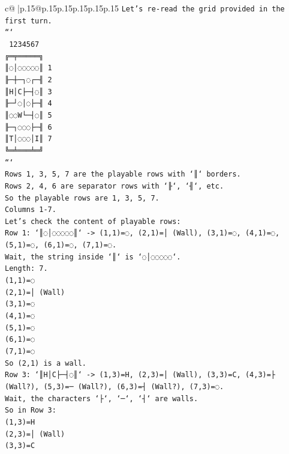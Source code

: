 \documentclass{article}
\begin{document}
{\begin{supertabular}{c@{$\;$}|p{.15\linewidth}@{}p{.15\linewidth}p{.15\linewidth}p{.15\linewidth}p{.15\linewidth}p{.15\linewidth}}
{{{\texttt{Let's re{-}read the grid provided in the first turn.} \\
\texttt{```} \\
\texttt{ 1234567} \\
\texttt{╔═╤═════╗} \\
\texttt{║◌│◌◌◌◌◌║ 1} \\
\texttt{╟─┼─┐◌┌─╢ 2} \\
\texttt{║H│C├─┤◌║ 3} \\
\texttt{╟─┘◌│◌├─╢ 4} \\
\texttt{║◌◌W└─┤◌║ 5} \\
\texttt{╟─┐◌◌◌├─╢ 6} \\
\texttt{║T│◌◌◌│I║ 7} \\
\texttt{╚═╧═══╧═╝} \\
\texttt{```} \\
\texttt{Rows 1, 3, 5, 7 are the playable rows with `║` borders.} \\
\texttt{Rows 2, 4, 6 are separator rows with `╟`, `╢`, etc.} \\
\texttt{So the playable rows are 1, 3, 5, 7.} \\
\texttt{Columns 1{-}7.} \\
\texttt{Let's check the content of playable rows:} \\
\texttt{Row 1: `║◌│◌◌◌◌◌║` {-}> (1,1)=◌, (2,1)=│ (Wall), (3,1)=◌, (4,1)=◌, (5,1)=◌, (6,1)=◌, (7,1)=◌.} \\
\texttt{Wait, the string inside `║` is `◌│◌◌◌◌◌`.} \\
\texttt{Length: 7.} \\
\texttt{(1,1)=◌} \\
\texttt{(2,1)=│ (Wall)} \\
\texttt{(3,1)=◌} \\
\texttt{(4,1)=◌} \\
\texttt{(5,1)=◌} \\
\texttt{(6,1)=◌} \\
\texttt{(7,1)=◌} \\
\texttt{So (2,1) is a wall.} \\
\texttt{Row 3: `║H│C├─┤◌║` {-}> (1,3)=H, (2,3)=│ (Wall), (3,3)=C, (4,3)=├ (Wall?), (5,3)=─ (Wall?), (6,3)=┤ (Wall?), (7,3)=◌.} \\
\texttt{Wait, the characters `├`, `─`, `┤` are walls.} \\
\texttt{So in Row 3:} \\
\texttt{(1,3)=H} \\
\texttt{(2,3)=│ (Wall)} \\
\texttt{(3,3)=C} \\
}}}
\end{supertabular}}
\end{document}
